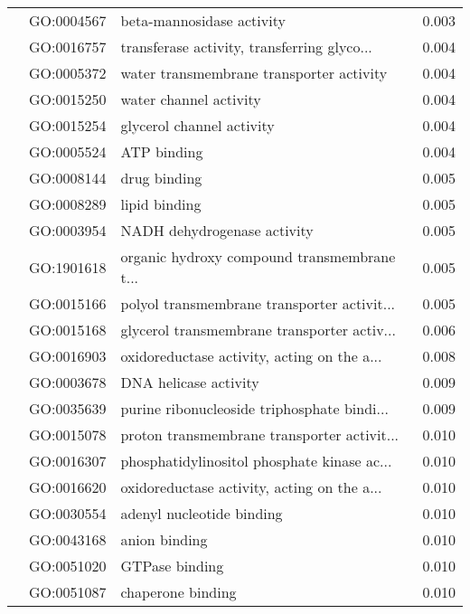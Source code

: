 \begin{longtable}{lllr}
   & GO:0004567 &                    beta-mannosidase activity &         0.003 \\
   & GO:0016757 &  transferase activity, transferring glyco... &         0.004 \\
   & GO:0005372 &     water transmembrane transporter activity &         0.004 \\
   & GO:0015250 &                       water channel activity &         0.004 \\
   & GO:0015254 &                    glycerol channel activity &         0.004 \\
   & GO:0005524 &                                  ATP binding &         0.004 \\
   & GO:0008144 &                                 drug binding &         0.005 \\
   & GO:0008289 &                                lipid binding &         0.005 \\
   & GO:0003954 &                  NADH dehydrogenase activity &         0.005 \\
   & GO:1901618 &  organic hydroxy compound transmembrane t... &         0.005 \\
   & GO:0015166 &  polyol transmembrane transporter activit... &         0.005 \\
   & GO:0015168 &  glycerol transmembrane transporter activ... &         0.006 \\
   & GO:0016903 &  oxidoreductase activity, acting on the a... &         0.008 \\
   & GO:0003678 &                        DNA helicase activity &         0.009 \\
   & GO:0035639 &  purine ribonucleoside triphosphate bindi... &         0.009 \\
   & GO:0015078 &  proton transmembrane transporter activit... &         0.010 \\
   & GO:0016307 &  phosphatidylinositol phosphate kinase ac... &         0.010 \\
   & GO:0016620 &  oxidoreductase activity, acting on the a... &         0.010 \\
   & GO:0030554 &                    adenyl nucleotide binding &         0.010 \\
   & GO:0043168 &                                anion binding &         0.010 \\
   & GO:0051020 &                               GTPase binding &         0.010 \\
   & GO:0051087 &                            chaperone binding &         0.010 \\

\end{longtable}
